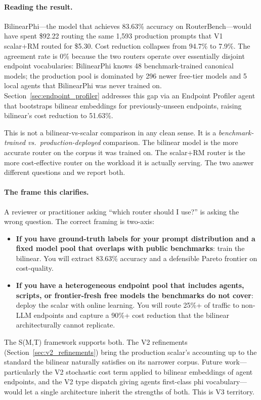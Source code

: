 \paragraph{Reading the result.} BilinearPhi---the model that achieves 83.63\% accuracy on RouterBench---would have spent \$92.22 routing the same 1{,}593 production prompts that V1 scalar+RM routed for \$5.30. Cost reduction collapses from 94.7\% to 7.9\%. The agreement rate is 0\% because the two routers operate over essentially disjoint endpoint vocabularies: BilinearPhi knows 48 benchmark-trained canonical models; the production pool is dominated by 296 newer free-tier models and 5 local agents that BilinearPhi was never trained on. Section~\ref{sec:endpoint_profiler} addresses this gap via an Endpoint Profiler agent that bootstraps bilinear embeddings for previously-unseen endpoints, raising bilinear's cost reduction to 51.63\%.

This is not a bilinear-vs-scalar comparison in any clean sense. It is a \emph{benchmark-trained vs.\ production-deployed} comparison. The bilinear model is the more accurate router on the corpus it was trained on. The scalar+RM router is the more cost-effective router on the workload it is actually serving. The two answer different questions and we report both.

\paragraph{The frame this clarifies.} A reviewer or practitioner asking ``which router should I use?'' is asking the wrong question. The correct framing is two-axis:

\begin{itemize}
    \item \textbf{If you have ground-truth labels for your prompt distribution and a fixed model pool that overlaps with public benchmarks}: train the bilinear. You will extract 83.63\% accuracy and a defensible Pareto frontier on cost-quality.
    \item \textbf{If you have a heterogeneous endpoint pool that includes agents, scripts, or frontier-fresh free models the benchmarks do not cover}: deploy the scalar with online learning. You will route 25\%+ of traffic to non-LLM endpoints and capture a 90\%+ cost reduction that the bilinear architecturally cannot replicate.
\end{itemize}

The S(M,T) framework supports both. The V2 refinements (Section~\ref{sec:v2_refinements}) bring the production scalar's accounting up to the standard the bilinear naturally satisfies on its narrower corpus. Future work---particularly the V2 stochastic cost term applied to bilinear embeddings of agent endpoints, and the V2 type dispatch giving agents first-class phi vocabulary---would let a single architecture inherit the strengths of both. This is V3 territory.

